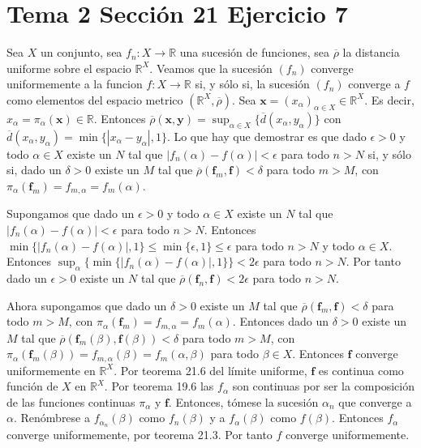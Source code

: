 \documentclass{article}
\newcommand{\vect}[1]{\boldsymbol{#1}}
\begin{document}
\section{Tema 2 Sección 21 Ejercicio 7}
Sea $X$ un conjunto, sea $f_n:X\rightarrow \mathbb{R}$ una sucesión de funciones, sea $\overline{\rho}$ la distancia uniforme sobre el espacio $\mathbb{R}^X$. Veamos que la sucesión $(f_n)$ converge uniformemente a la funcion $f:X\rightarrow \mathbb{R}$ si, y sólo si, la sucesión $(f_n)$ converge a $f$ como elementos del espacio metrico $(\mathbb{R}^X,\overline{\rho})$. Sea $\vect{x}=(x_\alpha)_{\alpha \in X}\in \mathbb{R}^X$. Es decir, $x_\alpha=\pi_\alpha(\vect{x})\in \mathbb{R}$. Entonces $\overline{\rho}(\vect{x},\vect{y})=\sup_{\alpha\in X}\{\overline{d}(x_\alpha,y_\alpha)\}$ con $\overline{d}(x_\alpha,y_\alpha)=\min\{|x_\alpha-y_\alpha|,1\}$. Lo que hay que demostrar es que  dado $\epsilon>0$ y todo $\alpha\in X$ existe un $N$ tal que  $|f_n(\alpha)-f(\alpha)|<\epsilon$ para todo $n>N$ si, y sólo si, dado un $\delta>0$ existe un $M$ tal que $\overline{\rho}(\vect{f}_m,\vect{f})<\delta$ para todo $m>M$, con $\pi_\alpha(\vect{f}_m)=f_{m,\alpha}=f_m(\alpha)$.

Supongamos que dado un $\epsilon>0$ y todo $\alpha\in X$ existe un $N$ tal que  $|f_n(\alpha)-f(\alpha)|<\epsilon$ para todo $n>N$. Entonces $\min\{|f_n(\alpha)-f(\alpha)|,1\}\leq\min\{\epsilon,1\}\leq\epsilon$ para todo $n>N$ y todo $\alpha\in X$. Entonces $\sup_\alpha\{\min\{|f_n(\alpha)-f(\alpha)|,1\}\}<2\epsilon$ para todo $n>N$. Por tanto dado un $\epsilon>0$ existe un $N$ tal que $\overline{\rho}(\vect{f}_n,\vect{f})<2\epsilon$ para todo $n>N$.

Ahora supongamos que dado un $\delta>0$ existe un $M$ tal que $\overline{\rho}(\vect{f}_m,\vect{f})<\delta$ para todo $m>M$, con $\pi_\alpha(\vect{f}_m)=f_{m,\alpha}=f_m(\alpha)$. Entonces dado un $\delta>0$ existe un $M$ tal que $\overline{\rho}(\vect{f}_m(\beta),\vect{f}(\beta))<\delta$ para todo $m>M$, con $\pi_\alpha(\vect{f}_m(\beta))=f_{m,\alpha}(\beta)=f_m(\alpha,\beta)$ para todo $\beta\in X$. Entonces $\vect{f}$ converge uniformemente en $\mathbb{R}^X$. Por teorema 21.6 del límite uniforme, $\vect{f}$ es continua como función de $X$ en $\mathbb{R}^X$. Por teorema 19.6 las $f_\alpha$ son continuas por ser la composición de las funciones continuas $\pi_\alpha$ y $\vect{f}$. Entonces, tómese la sucesión $\alpha_n$ que converge a $\alpha$. Renómbrese a $f_{\alpha_n}(\beta)$ como $f_n(\beta)$ y a $f_\alpha(\beta)$ como $f(\beta)$. Entonces $f_\alpha$ converge uniformemente, por teorema 21.3. Por tanto $f$ converge uniformemente.
\end{document}
